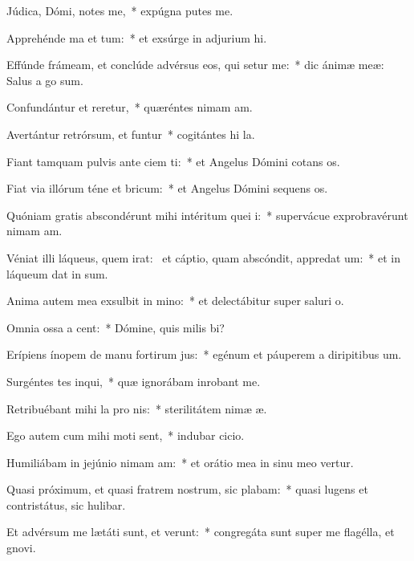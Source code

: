 \item Júdica, Dómi, notes me,~* expúgna putes me.
\item Apprehénde ma et tum:~* et exsúrge in adjurium hi.
\item Effúnde frámeam, et conclúde advérsus eos, qui setur me:~* dic ánimæ meæ: Salus a go sum.
\item Confundántur et reretur,~* quæréntes nimam am.
\item Avertántur retrórsum, et funtur~* cogitántes hi la.
\item Fiant tamquam pulvis ante ciem ti:~* et Angelus Dómini cotans os.
\item Fiat via illórum téne et bricum:~* et Angelus Dómini sequens os.
\item Quóniam gratis abscondérunt mihi intéritum quei i:~* supervácue exprobravérunt nimam am.
\item Véniat illi láqueus, quem irat:~\pscross{} et cáptio, quam abscóndit, appredat um:~* et in láqueum dat in sum.
\item Anima autem mea exsulbit in mino:~* et delectábitur super saluri o.
\item Omnia ossa a cent:~* Dómine, quis milis bi?
\item Erípiens ínopem de manu fortirum jus:~* egénum et páuperem a diripitibus um.
\item Surgéntes tes inqui,~* quæ ignorábam inrobant me.
\item Retribuébant mihi la pro nis:~* sterilitátem nimæ æ.
\item Ego autem cum mihi moti sent,~* indubar cicio.
\item Humiliábam in jejúnio nimam am:~* et orátio mea in sinu meo vertur.
\item Quasi próximum, et quasi fratrem nostrum, sic plabam:~* quasi lugens et contristátus, sic hulibar.
\item Et advérsum me lætáti sunt, et verunt:~* congregáta sunt super me flagélla, et gnovi.
